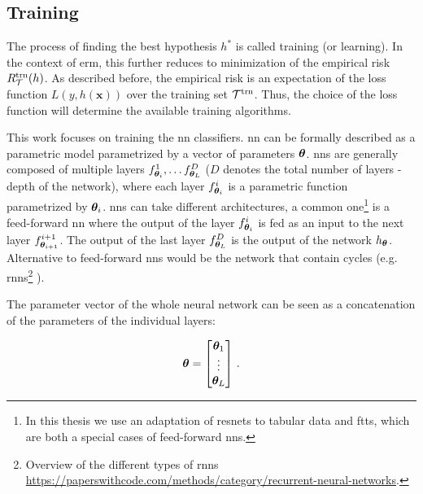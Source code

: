 




\subsection{Training}

The process of finding the best hypothesis $h^*$ is called training (or learning). In the context of \gls{erm}, this
further reduces to minimization of the empirical risk $R_\mathcal{T}^\text{trn}(h)$. As described before, the empirical risk is an
expectation of the loss function $L(y, h(\bm{x}))$ over the training set $\mathcal{T}^\text{trn}$. Thus, the choice of the loss function
will determine the available training algorithms.

This work focuses on training the \gls{nn} classifiers. \gls{nn} can be formally described as a parametric model
parametrized by a vector of parameters ${\boldsymbol{\theta}}$. \glspl{nn} are generally composed of multiple layers
$f_{{\boldsymbol{\theta}}_i}^1, \dots f_{{\boldsymbol{\theta}}_L}^D$ ($D$ denotes the total number of layers - depth of the network), where
each layer $f_{{\boldsymbol{\theta}}_i}^i$ is a parametric function parametrized by ${\boldsymbol{\theta}}_i$.  \glspl{nn} can take different
architectures, a common one\footnote{In this thesis we use an adaptation of \glspl{resnet} to tabular data and
    \glspl{ftt}, which are both a special cases of feed-forward \glspl{nn}.} is a feed-forward \gls{nn} where the output
of the layer $f_{{\boldsymbol{\theta}}_i}^i$ is fed as an input to the next layer $f_{{\boldsymbol{\theta}}_{i+1}}^{i+1}$. The output
of the last layer $f_{{\boldsymbol{\theta}}_L}^D$ is the output of the network $h_{{\boldsymbol{\theta}}}$. Alternative to feed-forward
\glspl{nn} would be the network that contain cycles (e.g.  \glspl{rnn}\footnote{Overview of the different types of
    \glspl{rnn} \url{https://paperswithcode.com/methods/category/recurrent-neural-networks}.} \cite{rnn,lstm}).

The parameter vector of the whole neural network can be seen as a concatenation of the parameters of the individual
layers:

\begin{equation}
    {\ensuremath{\boldsymbol{\theta}}} = \begin{bmatrix}
        {\ensuremath{\boldsymbol{\theta}}}_1 \\
        \vdots      \\
        {\boldsymbol{\theta}}_L
    \end{bmatrix}\,.
\end{equation}

